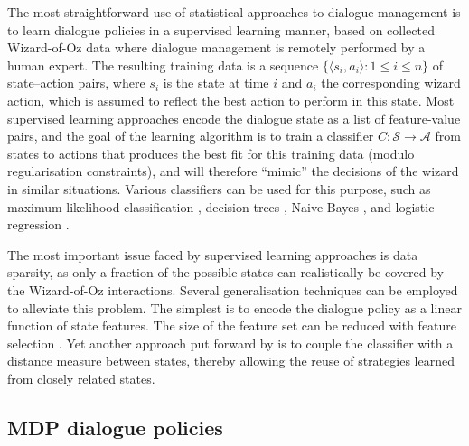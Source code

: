The most straightforward use of statistical approaches to dialogue management is to learn dialogue policies in a supervised learning manner, based on collected  Wizard-of-Oz data where dialogue management is remotely performed by a human expert.  The resulting training data is a sequence $\{\langle s_i, a_i \rangle : 1 \leq i \leq n\}$ of state--action pairs, where $s_i$ is the state at time $i$ and $a_i$ the corresponding wizard action, which is assumed to reflect the best action to perform in this state.  Most supervised learning approaches encode the dialogue state as a list of feature-value pairs, and the goal of the learning algorithm is to train a classifier $C: \mathcal{S} \rightarrow \mathcal{A}$  from states to actions that produces the best fit for this training data (modulo regularisation constraints), and will therefore ``mimic'' the decisions of the wizard in similar situations. Various classifiers can be used for this purpose, such as maximum likelihood classification \citep{Hurtado:2005}, decision trees \citep{LaneKU04}, Naive Bayes \citep{williams2003}, and logistic regression \citep{rieser2006,Passonneau2012}.  

The most important issue faced by supervised learning approaches is data sparsity, as only a fraction of the possible states can realistically be covered by the Wizard-of-Oz interactions.  Several generalisation techniques can be employed to alleviate this problem.  The simplest is to encode the dialogue policy as a linear function of state features. The size of the feature set can be reduced with feature selection \citep{Passonneau2012}. Yet another approach put forward by \cite{Hurtado:2005} is to couple the classifier with a distance measure between states, thereby allowing the reuse of strategies learned from closely related states.


\subsection{MDP dialogue policies}

